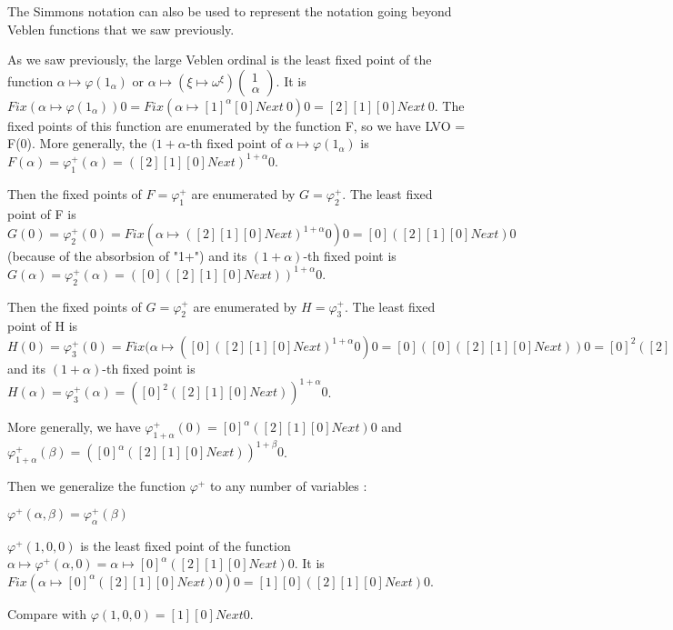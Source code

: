 \documentclass[10pt]{article}
\begin{document}
\bigskip

The Simmons notation can also be used to represent the notation going beyond Veblen functions that we saw previously.

As we saw previously, the large Veblen ordinal is the least fixed point of the function \( \alpha \mapsto \varphi(1_\alpha) \) or \( \alpha \mapsto (\xi \mapsto \omega^\xi) \begin{pmatrix} 1 \\ \alpha \end{pmatrix} \). It is \( Fix (\alpha \mapsto \varphi(1_\alpha)) 0 = Fix (\alpha \mapsto [1]^\alpha [0] Next\ 0) 0 = [2] [1] [0] Next\ 0 \). The fixed points of this function are enumerated by the function F, so we have LVO = F(0). More generally, the \( (1+\alpha\)-th fixed point of  \( \alpha \mapsto \varphi(1_\alpha) \) is \( F(\alpha) = \varphi^+_1(\alpha) = ([2] [1] [0] Next)^{1+\alpha} 0 \).

Then the fixed points of \( F = \varphi^+_1 \) are enumerated by \( G = \varphi^+_2 \). The least fixed point of F is \( G(0) = \varphi^+_2(0) = Fix (\alpha \mapsto ([2] [1] [0] Next)^{1+\alpha} 0) 0 = [0] ([2] [1] [0] Next) 0 \) (because of the absorbsion of "1+") and its \( (1+\alpha) \)-th fixed point is \( G(\alpha) = \varphi^+_2(\alpha) = ([0] ([2] [1] [0] Next))^{1+\alpha} 0 \).

Then the fixed points of \( G = \varphi^+_2 \) are enumerated by \( H = \varphi^+_3 \). The least fixed point of H is \( H(0) = \varphi^+_3(0) = Fix (\alpha \mapsto ([0] ([2] [1] [0] Next)^{1+\alpha} 0) 0 = [0] ([0] ([2] [1] [0] Next)) 0 = [0]^2 ([2] [1] [0] Next) 0 \) and its \( (1+\alpha) \)-th fixed point is \( H(\alpha) = \varphi^+_3(\alpha) = ([0]^2 ([2] [1] [0] Next))^{1+\alpha} 0 \).

More generally, we have \( \varphi^+_{1+\alpha}(0) = [0]^\alpha ([2] [1] [0] Next) 0 \) and \( \varphi^+_{1+\alpha}(\beta) = ([0]^\alpha ([2] [1] [0] Next))^{1+\beta} 0 \).

Then we generalize the function \( \varphi^+ \) to any number of variables : 

\( \varphi^+(\alpha,\beta) = \varphi^+_\alpha(\beta) \)

\( \varphi^+(1,0,0) \) is the least fixed point of the function \( \alpha \mapsto \varphi^+(\alpha,0) = \alpha \mapsto [0]^\alpha ([2] [1] [0] Next) 0 \). It is \( Fix (\alpha \mapsto [0]^\alpha ([2] [1] [0] Next) 0) 0 = [1] [0] ([2] [1] [0] Next) 0 \).

Compare with \( \varphi(1,0,0) = [1] [0] Next 0 \).
\end{document}
